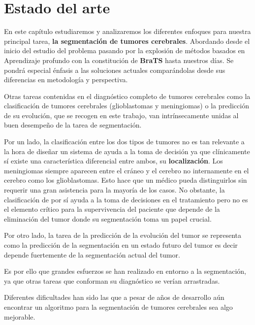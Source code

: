 \chapter{Estado del arte}

En este capítulo estudiaremos y analizaremos los diferentes enfoques para nuestra principal tarea, \textbf{la segmentación de tumores cerebrales}. Abordando desde el inicio del estudio del problema pasando por la explosión de métodos basados en Aprendizaje profundo con la constitución de \textbf{BraTS} hasta nuestros días. Se pondrá especial énfasis a las soluciones actuales comparándolas desde sus diferencias en metodología y perspectiva.

Otras tareas contenidas en el diagnóstico completo de tumores cerebrales como la clasificación de tumores cerebrales (glioblastomas y meningiomas) o la predicción de su evolución, que se recogen en este trabajo, van intrínsecamente unidas al buen desempeño de la tarea de segmentación. 

Por un lado, la clasificación entre los dos tipos de tumores no es tan relevante a la hora de diseñar un sistema de ayuda a la toma de decisión ya que clínicamente sí existe una característica diferencial entre ambos, su \textbf{localización}. Los meningiomas siempre aparecen entre el cráneo y el cerebro no internamente en el cerebro como los glioblastomas. Esto hace que un médico pueda distinguirlos sin requerir una gran asistencia para la mayoría de los casos. No obstante, la clasificación de por sí ayuda a la toma de decisiones en el tratamiento pero no es el elemento crítico para la supervivencia del paciente que depende de la eliminación del tumor donde su segmentación toma un papel crucial.

Por otro lado, la tarea de la predicción de la evolución del tumor se representa como la predicción de la segmentación en un estado futuro del tumor es decir depende fuertemente de la segmentación actual del tumor. 

Es por ello que grandes esfuerzos se han realizado en entorno a la segmentación, ya que otras tareas que conforman su diagnóstico se verían arrastradas.

Diferentes dificultades han sido las que a pesar de años de desarrollo aún encontrar un algoritmo para la segmentación de tumores cerebrales sea algo mejorable. 


